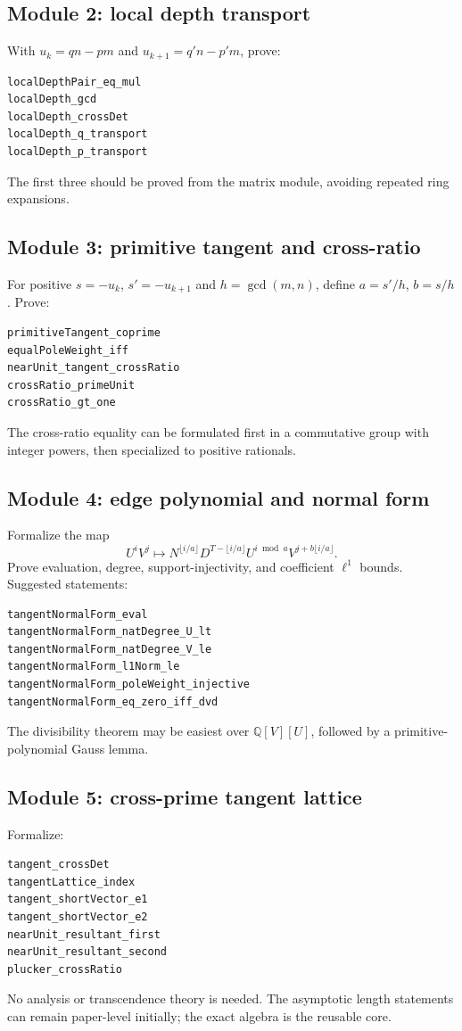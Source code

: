 \documentclass[11pt,oneside]{article}
\theoremstyle{definition}
\theoremstyle{remark}
\newcommand{\Q}{\mathbb Q}
\begin{document}
\subsection{Module 2: local depth transport}

With $u_k=qn-pm$ and $u_{k+1}=q'n-p'm$, prove:
\begin{verbatim}
localDepthPair_eq_mul
localDepth_gcd
localDepth_crossDet
localDepth_q_transport
localDepth_p_transport
\end{verbatim}
The first three should be proved from the matrix module, avoiding repeated ring expansions.

\subsection{Module 3: primitive tangent and cross-ratio}

For positive $s=-u_k$, $s'=-u_{k+1}$ and $h=\gcd(m,n)$, define
$a=s'/h$, $b=s/h$.  Prove:
\begin{verbatim}
primitiveTangent_coprime
equalPoleWeight_iff
nearUnit_tangent_crossRatio
crossRatio_primeUnit
crossRatio_gt_one
\end{verbatim}
The cross-ratio equality can be formulated first in a commutative group with integer powers,
then specialized to positive rationals.

\subsection{Module 4: edge polynomial and normal form}

Formalize the map
\[
 U^iV^j\longmapsto
 N^{\lfloor i/a\rfloor}D^{T-\lfloor i/a\rfloor}
 U^{i\bmod a}V^{j+b\lfloor i/a\rfloor}.
\]
Prove evaluation, degree, support-injectivity, and coefficient $\ell^1$ bounds.  Suggested
statements:
\begin{verbatim}
tangentNormalForm_eval
tangentNormalForm_natDegree_U_lt
tangentNormalForm_natDegree_V_le
tangentNormalForm_l1Norm_le
tangentNormalForm_poleWeight_injective
tangentNormalForm_eq_zero_iff_dvd
\end{verbatim}
The divisibility theorem may be easiest over $\Q[V][U]$, followed by a primitive-polynomial
Gauss lemma.

\subsection{Module 5: cross-prime tangent lattice}

Formalize:
\begin{verbatim}
tangent_crossDet
tangentLattice_index
tangent_shortVector_e1
tangent_shortVector_e2
nearUnit_resultant_first
nearUnit_resultant_second
plucker_crossRatio
\end{verbatim}
No analysis or transcendence theory is needed.  The asymptotic length statements can remain
paper-level initially; the exact algebra is the reusable core.
\end{document}
